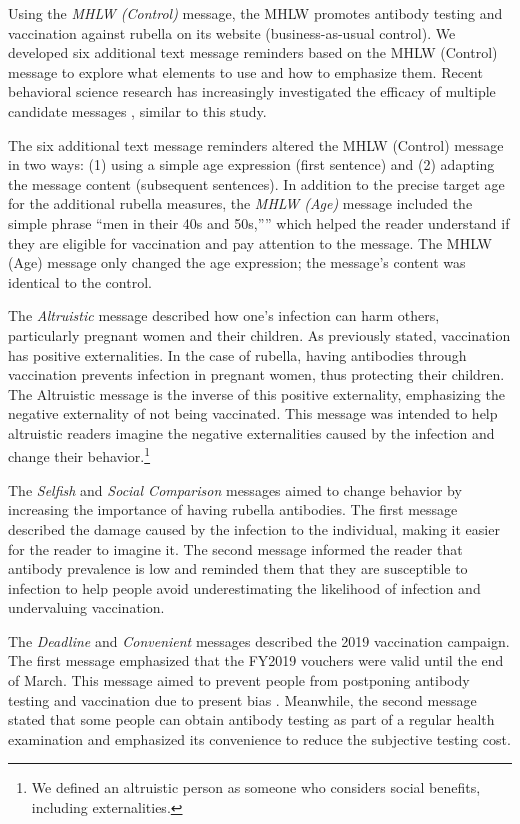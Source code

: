 \documentclass[
]{article}
\begin{document}
Using the \emph{MHLW (Control)} message, the MHLW promotes antibody testing and vaccination against rubella on its website (business-as-usual control). We developed six additional text message reminders based on the MHLW (Control) message to explore what elements to use and how to emphasize them. Recent behavioral science research has increasingly investigated the efficacy of multiple candidate messages \citep[e.g.,][\citet{Milkman2021}]{Dai2021}, similar to this study.

The six additional text message reminders altered the MHLW (Control) message in two ways: (1) using a simple age expression (first sentence) and (2) adapting the message content (subsequent sentences). In addition to the precise target age for the additional rubella measures, the \emph{MHLW (Age)} message included the simple phrase ``men in their 40s and 50s,'''' which helped the reader understand if they are eligible for vaccination and pay attention to the message. The MHLW (Age) message only changed the age expression; the message's content was identical to the control.

The \emph{Altruistic} message described how one's infection can harm others, particularly pregnant women and their children. As previously stated, vaccination has positive externalities. In the case of rubella, having antibodies through vaccination prevents infection in pregnant women, thus protecting their children. The Altruistic message is the inverse of this positive externality, emphasizing the negative externality of not being vaccinated. This message was intended to help altruistic readers imagine the negative externalities caused by the infection and change their behavior.\footnote{We defined an altruistic person as someone who considers social benefits, including externalities.}

The \emph{Selfish} and \emph{Social Comparison} messages aimed to change behavior by increasing the importance of having rubella antibodies. The first message described the damage caused by the infection to the individual, making it easier for the reader to imagine it. The second message informed the reader that antibody prevalence is low and reminded them that they are susceptible to infection to help people avoid underestimating the likelihood of infection and undervaluing vaccination.

The \emph{Deadline} and \emph{Convenient} messages described the 2019 vaccination campaign. The first message emphasized that the FY2019 vouchers were valid until the end of March. This message aimed to prevent people from postponing antibody testing and vaccination due to present bias \citep{ODonoghue2001}. Meanwhile, the second message stated that some people can obtain antibody testing as part of a regular health examination and emphasized its convenience to reduce the subjective testing cost.
\end{document}

